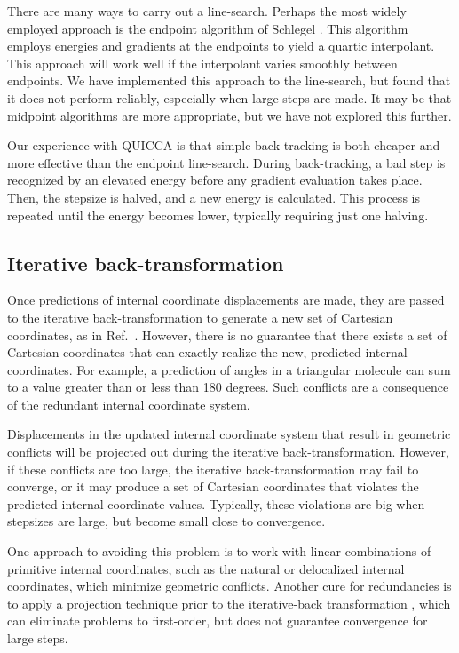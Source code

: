 \documentclass[prl,aps,preprint,superbib,12pt]{revtex4}
\begin{document}
There are many ways to carry out a line-search.  Perhaps the most widely employed 
approach is the endpoint algorithm of Schlegel \cite{HSchlegel82}.  This algorithm
employs energies and gradients at the endpoints to yield a quartic interpolant.  This
approach will work well if the interpolant varies smoothly between endpoints.  We have
implemented this approach to the line-search, but found that it does not perform 
reliably, especially when large steps are made.   It may be that midpoint algorithms
are more appropriate, but we have not explored this further.

Our experience with QUICCA is that simple back-tracking is both cheaper and more effective
than the endpoint line-search.  During back-tracking, a  bad step is recognized by an elevated
energy before any gradient evaluation takes place. Then, the stepsize is halved,
and a new energy is calculated.  This process is repeated until the energy becomes lower,
typically requiring just one halving.

\subsection{Iterative back-transformation}\label{transformation}

Once predictions of internal coordinate displacements are made, they are passed to the 
iterative back-transformation to generate a new set of Cartesian coordinates, as in 
Ref.~.   However, there is no guarantee that there exists a set of 
Cartesian coordinates that can exactly realize the new, predicted internal coordinates.  
For example, a prediction of angles in a triangular molecule can sum 
to a value greater than or less than 180 degrees. Such conflicts are a consequence of 
the redundant internal coordinate system.  

Displacements in the updated internal coordinate system that result in geometric conflicts 
will be projected out during the iterative back-transformation. However, if 
these conflicts are too large, the iterative back-transformation may fail to converge,
or it may produce a set of Cartesian coordinates that violates the predicted internal 
coordinate values. Typically, these violations are big when stepsizes are large, but become 
small close to convergence.  

One approach to avoiding this problem is to work with linear-combinations of primitive internal
coordinates, such as the natural \cite{GFogarasi92} or delocalized
\cite{JBaker96} internal coordinates, which minimize geometric conflicts.  
Another cure for redundancies is to apply a projection technique prior to the iterative-back 
transformation \cite{PPulay77}, which can eliminate problems to first-order, but does not 
guarantee convergence for large steps.
\end{document}
